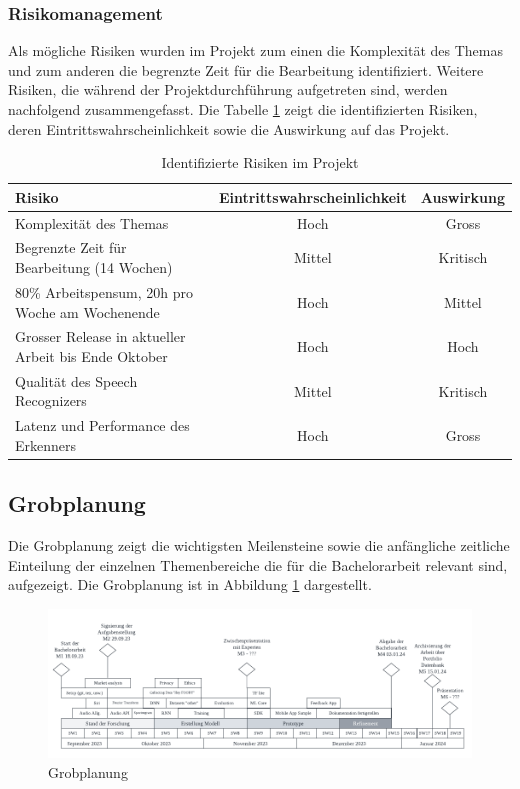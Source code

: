 \documentclass[main.tex]{subfiles} %
\begin{document}
\subsubsection{Risikomanagement}
Als mögliche Risiken wurden im Projekt zum einen die Komplexität des Themas und zum anderen die
begrenzte Zeit für die Bearbeitung identifiziert. Weitere Risiken, die während der 
Projektdurchführung aufgetreten sind, werden nachfolgend zusammengefasst. Die Tabelle 
\ref{tab:risiken} zeigt die identifizierten Risiken, deren Eintrittswahrscheinlichkeit sowie die 
Auswirkung auf das Projekt.

\begin{table}[h]
    \centering
    \begin{tabular}{|l|c|c|}
        \hline
        \textbf{Risiko} & \textbf{Eintrittswahrscheinlichkeit} & \textbf{Auswirkung} \\
        \hline
        Komplexität des Themas & Hoch & Gross \\
        \hline
        Begrenzte Zeit für Bearbeitung (14 Wochen) & Mittel & Kritisch \\
        \hline
        80\% Arbeitspensum, 20h pro Woche am Wochenende & Hoch & Mittel \\
        \hline
        Grosser Release in aktueller Arbeit bis Ende Oktober & Hoch & Hoch \\
        \hline
        Qualität des Speech Recognizers & Mittel & Kritisch \\
        \hline
        Latenz und Performance des Erkenners & Hoch & Gross \\
        \hline
    \end{tabular}
    \caption{Identifizierte Risiken im Projekt}
    \label{tab:risiken}
\end{table}



\begin{landscape}
    \subsection{Grobplanung}
    Die Grobplanung zeigt die wichtigsten Meilensteine sowie die anfängliche zeitliche Einteilung 
    der einzelnen Themenbereiche die für die Bachelorarbeit relevant sind, aufgezeigt. Die
    Grobplanung ist in Abbildung \ref{fig:grobplanung} dargestellt.

    \begin{figure}[!htb]
        \centering
        \includegraphics[width=\linewidth]{img/projectplan.pdf}
        \caption{Grobplanung}
        \label{fig:grobplanung}
    \end{figure}
\end{landscape}
\end{document}
